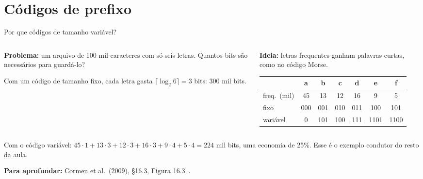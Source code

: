 \documentclass[aspectratio=169,xcolor=table]{beamer}
\newcommand{\fonte}[1]{%
  \vfill
  {\tiny\color{gray!55!black}\textbf{Para aprofundar:} #1\par}%
}
\begin{document}
\section{Códigos de prefixo}

\begin{frame}{Por que códigos de tamanho variável?}
  \begin{columns}[T]
    \begin{column}{0.48\textwidth}
      \textbf{Problema:} um arquivo de 100 mil caracteres com só seis letras. Quantos bits
      são necessários para guardá-lo?
      \medskip

      {\small Com um código de tamanho fixo, cada letra gasta $\lceil \log_2 6 \rceil = 3$
      bits: 300 mil bits.}
    \end{column}
    \begin{column}{0.48\textwidth}
      \textbf{Ideia:} letras frequentes ganham palavras curtas, como no código Morse.
      \medskip

      \centering\scriptsize\setlength{\tabcolsep}{3pt}
      \begin{tabular}{lcccccc}
        \toprule
        & a & b & c & d & e & f \\
        \midrule
        freq.\ (mil) & 45 & 13 & 12 & 16 & 9 & 5 \\
        fixo & 000 & 001 & 010 & 011 & 100 & 101 \\
        variável & 0 & 101 & 100 & 111 & 1101 & 1100 \\
        \bottomrule
      \end{tabular}
    \end{column}
  \end{columns}
  \medskip
  {\small Com o código variável:
  $45 \cdot 1 + 13 \cdot 3 + 12 \cdot 3 + 16 \cdot 3 + 9 \cdot 4 + 5 \cdot 4 = 224$ mil bits,
  uma economia de 25\%. Esse é o exemplo condutor do resto da aula.\par}
  \fonte{Cormen et al.\ (2009), \S 16.3, Figura 16.3~\cite{cormen2009introduction}.}
\end{frame}
\end{document}

